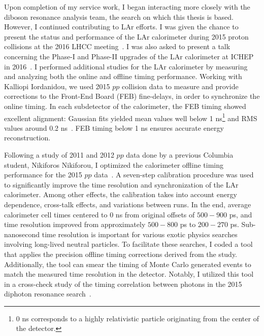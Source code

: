 Upon completion of my service work, I began interacting more closely with the diboson resonance analysis team, the search on which this thesis is based.
However, I continued contributing to LAr efforts. I was given the chance to present the status and performance of the LAr calorimeter during 2015 proton collisions at the 2016 LHCC meeting~\cite{lhcc_poster}. I was also asked to present a talk concerning the Phase-I and Phase-II upgrades of the LAr calorimeter at ICHEP in 2016~\cite{ryne_ichep_talk}. I performed additional studies for the LAr calorimeter by measuring and analyzing both the online and offline timing performance. Working with Kalliopi Iordanidou, we used 2015 $pp$ collision data to measure and provide corrections to the Front-End Board (FEB) fine-delays, in order to synchronize the online timing. In each subdetector of the calorimeter, the FEB timing showed excellent alignment: Gaussian fits yielded mean values well below 1 ns\footnote{
    0 ns corresponds to a highly relativistic particle originating from the center of the detector.
} and RMS values around 0.2 ns~\cite{LArCaloPublicResults2015}. FEB timing below 1 ns ensures accurate energy reconstruction.

Following a study of 2011 and 2012 $pp$ data done by a previous Columbia student, Nikiforos Nikiforou, 
I optimized the calorimeter offline timing performance for the 2015 $pp$ data~\cite{LArTiming_2015}. A seven-step calibration procedure was used to significantly improve the time resolution and synchronization of the LAr calorimeter. Among other effects, the calibration takes into account energy dependence, cross-talk effects, and variations between runs. In the end, average calorimeter cell times centered to 0 ns from original offsets of $500-900$ ps, and time resolution improved from approximately $500-800$ ps to $200-270$ ps. Sub-nanosecond time resolution is important for various exotic physics searches involving long-lived neutral particles. To facilitate these searches, I coded a tool that applies the precision offline timing corrections derived from the study. Additionally, the tool can smear the timing of Monte Carlo generated events to match the measured time resolution in the detector. Notably, I utilized this tool in a cross-check study of the timing correlation between photons in the 2015 diphoton resonance search~\cite{diphoton_paper}.

